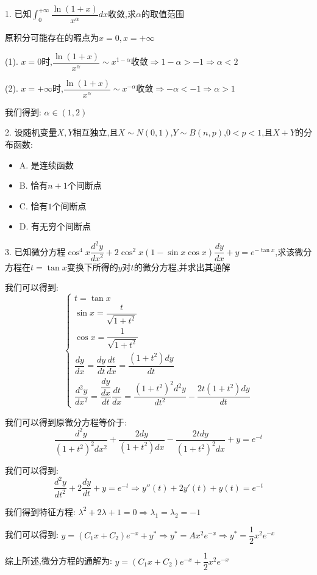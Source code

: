 1. 已知$\int_{0}^{+\infty}\dfrac{\ln(1+x)}{x^{\alpha}}dx$收敛,求$\alpha$的取值范围

\begin{solution}

	原积分可能存在的暇点为$x=0,x=+\infty$
	
	(1). $x=0$时,$\dfrac{\ln(1+x)}{x^{\alpha}}\sim x^{1-\alpha}$收敛$\Rightarrow 1-\alpha>-1\Rightarrow \alpha<2$
	
	(2). $x=+\infty$时,$\dfrac{\ln(1+x)}{x^{\alpha}}\sim x^{-\alpha}$收敛$\Rightarrow -\alpha<-1\Rightarrow \alpha>1$
	
	我们得到:  $\alpha\in(1,2)$
\end{solution}

2. 设随机变量$X,Y$相互独立,且$X\sim N(0,1)$,$Y\sim B(n,p)$,$0<p<1$,且$X+Y$的分布函数:  
\begin{itemize}
	\item A. 是连续函数
	\item B. 恰有$n+1$个间断点
	\item C. 恰有$1$个间断点
	\item D. 有无穷个间断点
\end{itemize}
\begin{solution}
	
\end{solution}

3. 已知微分方程$\cos^4 x\dfrac{d^2y}{dx^2}+2\cos^2 x(1-\sin x\cos x)\dfrac{dy}{dx}+y=e^{-\tan x}$,求该微分方程在$t=\tan x$变换下所得的$y$对$t$的微分方程,并求出其通解

\begin{solution}

	我们可以得到:  $$\left\lbrace
	\begin{array}{l}
		t=\tan x\\
		\sin x=\dfrac{t}{\sqrt{1+t^2}}\\
		\cos x=\dfrac{1}{\sqrt{1+t^2}}\\
		\dfrac{dy}{dx}=\dfrac{dy}{dt}\dfrac{dt}{dx}=\dfrac{(1+t^2)dy}{dt}\\
		\dfrac{d^2y}{dx^2}=\dfrac{\dfrac{dy}{dx}}{dt}\dfrac{dt}{dx}=\dfrac{(1+t^2)^2d^2y}{dt^2}-\dfrac{2t(1+t^2)dy}{dt}
	\end{array}
	\right. $$
	
	我们可以得到原微分方程等价于:  
	$$\dfrac{d^2y}{(1+t^2)^2dx^2}+\dfrac{2dy}{(1+t^2)dx}-\dfrac{2tdy}{(1+t^2)^2dx}+y=e^{-t}$$
	
	我们可以得到:  
	$$\dfrac{d^2y}{dt^2}+2\dfrac{dy}{dt}+y=e^{-t}\Rightarrow y''(t)+2y'(t)+y(t)=e^{-t}$$
	
	我们得到特征方程:  $\lambda^2+2\lambda+1=0\Rightarrow \lambda_{1}=\lambda_{2}=-1$
	
	我们可以得到:  $y=(C_{1}x+C_{2})e^{-x}+y^{*}\Rightarrow y^{*}=Ax^2e^{-x}\Rightarrow y^{*}=\dfrac{1}{2}x^2e^{-x}$
	
	综上所述,微分方程的通解为:  $y=(C_{1}x+C_{2})e^{-x}+\dfrac{1}{2}x^2e^{-x}$
\end{solution}

